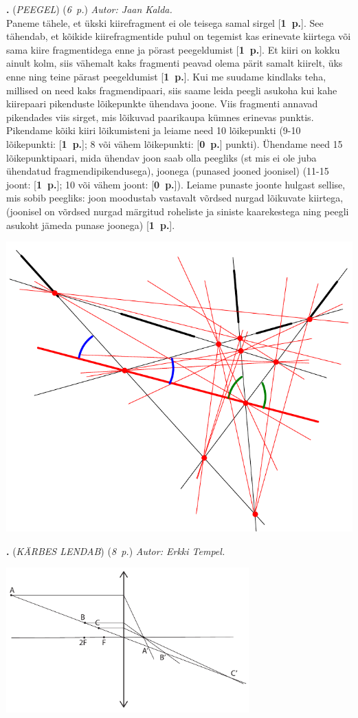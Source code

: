 \documentclass[12pt,a5paper]{article}
\newcommand{\numb}[1]{\vspace{5pt}\textbf{\large #1}}
\newcommand{\nimi}[1]{(\textsl{\small #1})}
\newcommand{\punktid}[1]{(\emph{#1~p.})}
\newcounter{ylesanne}
\newcommand{\yl}[1]{\addtocounter{ylesanne}{1}\numb{\theylesanne.} \nimi{#1} \newblock{}}
\newcommand{\pp}[1]{[\textbf{#1~p.}]}
\newcommand{\autor}[1]{\emph{ Autor: #1.\\}}
\begin{document}
\newpage
\yl{PEEGEL} \punktid{6}\autor{Jaan Kalda}
Paneme tähele, et ükski kiirefragment ei ole teisega samal sirgel \pp{1}. See tähendab, et kõikide kiirefragmentide puhul on tegemist kas erinevate kiirtega või sama kiire fragmentidega enne ja pörast peegeldumist \pp{1}. Et kiiri on kokku ainult kolm, siis vähemalt kaks fragmenti peavad olema pärit samalt kiirelt, üks enne ning teine pärast peegeldumist \pp{1}. Kui me suudame kindlaks teha, millised on need kaks fragmendipaari, siis saame leida peegli asukoha kui kahe kiirepaari pikenduste lõikepunkte ühendava joone. Viis fragmenti annavad pikendades viis sirget, mis lõikuvad paarikaupa kümnes erinevas punktis. Pikendame kõiki kiiri lõikumisteni ja leiame need 10 lõikepunkti (9-10 lõikepunkti: \pp{1}; 8 või vähem lõikepunkti: \pp{0} punkti). Ühendame need 15 lõikepunktipaari, mida ühendav joon saab olla peegliks (st mis ei ole juba ühendatud fragmendipikendusega), joonega (punased jooned joonisel) (11-15 joont: \pp{1}; 10 või vähem joont: \pp{0}). Leiame punaste joonte hulgast sellise, mis sobib peegliks: joon moodustab vastavalt võrdsed nurgad lõikuvate kiirtega, (joonisel on võrdsed nurgad märgitud roheliste ja siniste kaarekestega ning peegli asukoht jämeda punase joonega) \pp{1}. 
\begin{center}
\includegraphics[scale=0.7]{peegel_lah.pdf}
\end{center}
\newpage
\yl{KÄRBES LENDAB}\punktid{8}\autor{Erkki Tempel}
  \vspace{-20pt}
  \begin{center}
    \includegraphics[width=0.7\textwidth]{karbeslah}
  \end{center}
  \vspace{-20pt}
\end{document}
